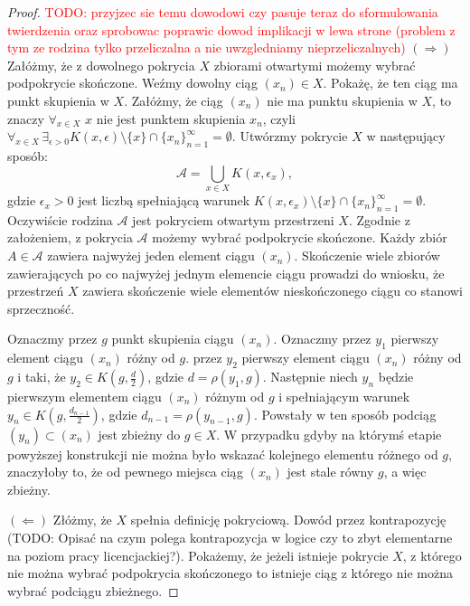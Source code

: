 \documentclass[licencjacka]{pwr_wmat_praca_dyplomowa}
\theoremstyle{plain}
\numberwithin{theorem}{chapter}
\theoremstyle{definition}
\numberwithin{theorem}{chapter}
\begin{document}
\begin{proof}
\textcolor{red}{TODO: przyjzec sie temu dowodowi czy pasuje teraz do sformulowania twierdzenia oraz sprobowac poprawic dowod  implikacji w lewa strone (problem z tym ze rodzina tylko przeliczalna a nie uwzgledniamy nieprzeliczalnych)}
$(\Rightarrow)$
Załóżmy, że z dowolnego pokrycia $X$ zbiorami otwartymi możemy wybrać podpokrycie skończone. Weźmy dowolny ciąg $(x_n) \in X$. Pokażę, że ten ciąg ma punkt skupienia w $X$. Załóżmy, że ciąg $(x_n)$ nie ma punktu skupienia w $X$, to znaczy $\forall_{x \in X}$ $x$ nie jest punktem skupienia $x_n$, czyli $\forall_{x \in X} \, \exists_{\epsilon > 0}  K(x, \epsilon) \setminus \{x\} \cap \{x_n\}_{n=1}^{\infty} = \emptyset$. Utwórzmy pokrycie $X$ w następujący sposób: $$\mathcal{A} = \bigcup_{x \in X} K(x, \epsilon_x),$$ gdzie $\epsilon_x > 0$ jest liczbą spełniającą warunek $K(x, \epsilon_x) \setminus \{x\} \cap \{x_n\}_{n=1}^{\infty} = \emptyset$. Oczywiście rodzina $\mathcal{A}$ jest pokryciem otwartym przestrzeni $X$. Zgodnie z założeniem, z pokrycia $\mathcal{A}$ możemy wybrać podpokrycie skończone. Każdy zbiór $A \in \mathcal{A}$ zawiera najwyżej jeden element ciągu $(x_n)$. Skończenie wiele zbiorów zawierających po co najwyżej jednym elemencie ciągu prowadzi do wniosku, że przestrzeń $X$ zawiera skończenie wiele elementów nieskończonego ciągu co stanowi sprzeczność.

Oznaczmy przez $g$ punkt skupienia ciągu $(x_n)$. Oznaczmy przez $y_1$ pierwszy element ciągu $(x_n)$ różny od $g$. przez $y_2$ pierwszy element ciągu $(x_n)$ różny od $g$ i taki, że $y_2 \in K(g, \frac{d}{2})$, gdzie $d = \rho(y_1, g)$.
Następnie niech $y_n$ będzie pierwszym elementem ciągu $(x_n)$ różnym od $g$ i spełniającym warunek $y_n \in K(g, \frac{d_{n-1}}{2})$, gdzie $d_{n-1} = \rho(y_{n-1}, g)$. Powstały w ten sposób podciąg $(y_n) \subset (x_n)$ jest zbieżny do $g \in X$. W przypadku gdyby na którymś etapie powyższej konstrukcji nie można było wskazać kolejnego elementu różnego od $g$, znaczyłoby to, że od pewnego miejsca ciąg $(x_n)$ jest stale równy $g$, a więc zbieżny.

$(\Leftarrow)$
Złóżmy, że $X$ spełnia definicję pokryciową.
Dowód przez kontrapozycję (TODO: Opisać na czym polega kontrapozycja w logice czy to zbyt elementarne na poziom pracy licencjackiej?). Pokażemy, że jeżeli istnieje pokrycie $X$, z którego nie można wybrać podpokrycia skończonego to istnieje ciąg z którego nie można wybrać podciągu zbieżnego.


\end{proof}
\end{document}
